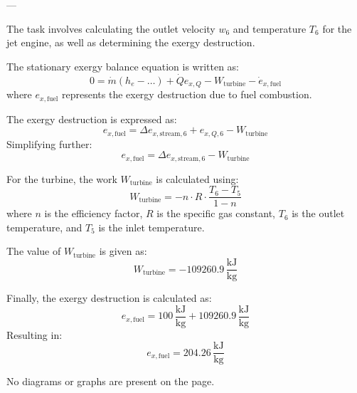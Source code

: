 ---

The task involves calculating the outlet velocity \( w_6 \) and temperature \( T_6 \) for the jet engine, as well as determining the exergy destruction.

The stationary exergy balance equation is written as:  
\[
0 = \dot{m} \left( h_e - \ldots \right) + \dot{Q} e_{x,Q} - W_{\text{turbine}} - \dot{e}_{x,\text{fuel}}
\]  
where \( e_{x,\text{fuel}} \) represents the exergy destruction due to fuel combustion.  

The exergy destruction is expressed as:  
\[
e_{x,\text{fuel}} = \Delta e_{x,\text{stream},6} + e_{x,Q,6} - W_{\text{turbine}}
\]  
Simplifying further:  
\[
e_{x,\text{fuel}} = \Delta e_{x,\text{stream},6} - W_{\text{turbine}}
\]  

For the turbine, the work \( W_{\text{turbine}} \) is calculated using:  
\[
W_{\text{turbine}} = -n \cdot R \cdot \frac{T_6 - T_5}{1 - n}
\]  
where \( n \) is the efficiency factor, \( R \) is the specific gas constant, \( T_6 \) is the outlet temperature, and \( T_5 \) is the inlet temperature.  

The value of \( W_{\text{turbine}} \) is given as:  
\[
W_{\text{turbine}} = -109260.9 \, \frac{\text{kJ}}{\text{kg}}
\]  

Finally, the exergy destruction is calculated as:  
\[
e_{x,\text{fuel}} = 100 \, \frac{\text{kJ}}{\text{kg}} + 109260.9 \, \frac{\text{kJ}}{\text{kg}}
\]  
Resulting in:  
\[
e_{x,\text{fuel}} = 204.26 \, \frac{\text{kJ}}{\text{kg}}
\]  

No diagrams or graphs are present on the page.